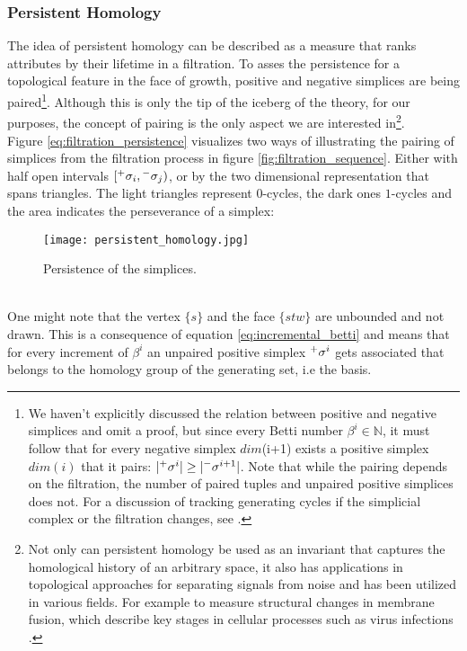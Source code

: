 \subsubsection{Persistent Homology}
\label{math_persistence}

The idea of persistent homology can be described as a measure that ranks attributes by their lifetime in a filtration.
To asses the persistence for a topological feature in the face of growth, positive and negative simplices are being paired\footnote{ We haven't explicitly discussed the relation between positive and negative simplices and omit a proof, but since every Betti number $\beta^{i} \in \mathbb{N}$, it must follow that for every negative simplex $dim$(i+1) exists a positive simplex $dim(i)$ that it pairs: $|\Prefix^{+}{\sigma^{i}}| \geq |\Prefix^{-}{\sigma^{i+1}}|$. Note that while the pairing depends on the filtration, the number of paired tuples and unpaired positive simplices does not. For a discussion of tracking generating cycles if the simplicial complex or the filtration changes, see \citep[][]{Busaryev2010}.}\label{fn:simplex_relation}.
Although this is only the tip of the iceberg of the theory, for our purposes, the concept of pairing is the only aspect we are interested in\footnote{ Not only can persistent homology be used as an invariant that captures the homological history of an arbitrary space, it also has applications in topological approaches for separating signals from noise and has been utilized in various fields. For example to measure structural changes in membrane fusion, which describe key stages in cellular processes such as virus infections \citep[cf.][]{Kasson2007}.}.\\
Figure \ref{eq:filtration_persistence} visualizes two ways of illustrating the pairing of simplices from the filtration process in figure \ref{fig:filtration_sequence}.
Either with half open intervals $[\Prefix^{+}{\sigma_{i}}, \Prefix^{-}{\sigma_{j}})$, or by the two dimensional representation that spans triangles.
The light triangles represent $0$-cycles, the dark ones $1$-cycles and the area indicates the perseverance of a simplex:
\begin{figure}[htb]
\centering
\texttt{[image: persistent\_homology.jpg]}
\caption[Persistence of the simplices]{Persistence of the simplices.}
\label{fig:persistent_homology}
\end{figure}\\
One might note that the vertex $\{s\}$ and the face $\{stw\}$ are unbounded and not drawn.
This is a consequence of equation \eqref{eq:incremental_betti} and means that for every increment of $\beta^{i}$ an unpaired  positive simplex $\Prefix^{+}{\sigma^{i}}$ gets associated that belongs to the homology group of the generating set, i.e the basis.
